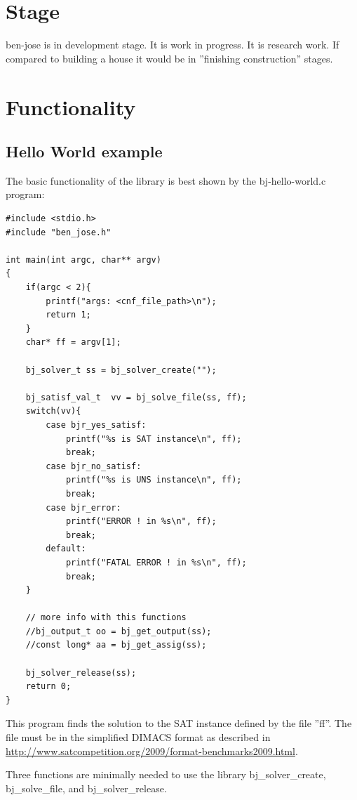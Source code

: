 \documentclass{easychair}
\newcommand{\bjsolvercreate}{bj\_solver\_create}
\newcommand{\bjsolvefile}{bj\_solve\_file}
\newcommand{\bjsolverrelease}{bj\_solver\_release}
\begin{document}
\section{Stage}

ben-jose is in development stage. It is work in progress. It is research work. If compared to building a house it would be in ''finishing construction'' stages.

\section{Functionality}
\label{sect:funtionality}

\subsection{Hello World example}
\label{sect:dimacs}

The basic functionality of the library is best shown by the bj-hello-world.c program:

\begin{lstlisting}[label=hello-prog, caption=bj-hello-world.c program,]
#include <stdio.h>
#include "ben_jose.h"

int main(int argc, char** argv)
{
	if(argc < 2){
		printf("args: <cnf_file_path>\n");
		return 1;
	}
	char* ff = argv[1];
	
	bj_solver_t ss = bj_solver_create("");
	
	bj_satisf_val_t  vv = bj_solve_file(ss, ff);
	switch(vv){
		case bjr_yes_satisf:
			printf("%s is SAT instance\n", ff);
			break;
		case bjr_no_satisf:
			printf("%s is UNS instance\n", ff);
			break;
		case bjr_error:
			printf("ERROR ! in %s\n", ff);
			break;
		default:
			printf("FATAL ERROR ! in %s\n", ff);
			break;
	}
	
	// more info with this functions
	//bj_output_t oo = bj_get_output(ss);
	//const long* aa = bj_get_assig(ss);
	
	bj_solver_release(ss);
	return 0;
}
\end{lstlisting}

This program finds the solution to the SAT instance defined by the file ''ff''. The file must be in the simplified DIMACS format as described in \url{http://www.satcompetition.org/2009/format-benchmarks2009.html}.

Three functions are minimally needed to use the library \bjsolvercreate, \bjsolvefile, and \bjsolverrelease.
\end{document}
